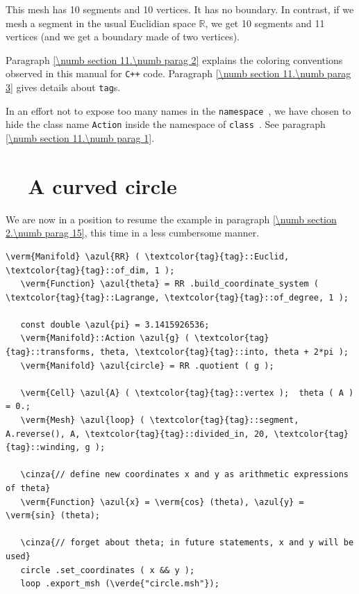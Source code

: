This mesh has 10 segments and 10 vertices. It has no boundary.
In contrast, if we mesh a segment in the usual Euclidian space $ \mathbb{R} $,
we get 10 segments and 11 vertices (and we get a boundary made of two vertices).

Paragraph \ref{\numb section 11.\numb parag 2} explains the coloring conventions observed
in this manual for {\tt C++} code.
Paragraph \ref{\numb section 11.\numb parag 3} gives details about
{\small\tt\textcolor{tag}{tag}}s.

In an effort not to expose too many names in the {\small\tt namespace },
we have chosen to hide the class name {\small\tt Action} inside the namespace of
{\small\tt class }.
See paragraph \ref{\numb section 11.\numb parag 1}.


\section{~~A curved circle}\label{\numb section 7.\numb parag 2}

We are now in a position to resume the example in paragraph \ref{\numb section 2.\numb parag 15},
this time in a less cumbersome manner.

\begin{Verbatim}[commandchars=\\\{\},formatcom=\small\tt,frame=single,
   label=parag-\ref{\numb section 7.\numb parag 2}.cpp,rulecolor=\color{coment},
   baselinestretch=0.94,framesep=2mm                                            ]
   \verm{Manifold} \azul{RR} ( \textcolor{tag}{tag}::Euclid, \textcolor{tag}{tag}::of_dim, 1 );
   \verm{Function} \azul{theta} = RR .build_coordinate_system ( \textcolor{tag}{tag}::Lagrange, \textcolor{tag}{tag}::of_degree, 1 );

   const double \azul{pi} = 3.1415926536;
   \verm{Manifold}::Action \azul{g} ( \textcolor{tag}{tag}::transforms, theta, \textcolor{tag}{tag}::into, theta + 2*pi );
   \verm{Manifold} \azul{circle} = RR .quotient ( g );

   \verm{Cell} \azul{A} ( \textcolor{tag}{tag}::vertex );  theta ( A ) = 0.;
   \verm{Mesh} \azul{loop} ( \textcolor{tag}{tag}::segment, A.reverse(), A, \textcolor{tag}{tag}::divided_in, 20, \textcolor{tag}{tag}::winding, g );

   \cinza{// define new coordinates x and y as arithmetic expressions of theta}
   \verm{Function} \azul{x} = \verm{cos} (theta), \azul{y} = \verm{sin} (theta);

   \cinza{// forget about theta; in future statements, x and y will be used}
   circle .set_coordinates ( x && y );
   loop .export_msh (\verde{"circle.msh"});
\end{Verbatim}

